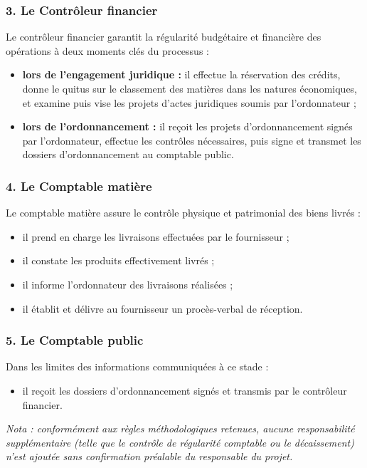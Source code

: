 \subsubsection{3. Le Contrôleur financier}
Le contrôleur financier garantit la régularité budgétaire et financière des opérations à deux moments clés du processus :
\begin{itemize}
  \item \textbf{lors de l'engagement juridique :} il effectue la réservation des crédits, donne le quitus sur le classement des matières dans les natures économiques, et examine puis vise les projets d'actes juridiques soumis par l'ordonnateur ;
  \item \textbf{lors de l'ordonnancement :} il reçoit les projets d'ordonnancement signés par l'ordonnateur, effectue les contrôles nécessaires, puis signe et transmet les dossiers d'ordonnancement au comptable public.
\end{itemize}

\subsubsection{4. Le Comptable matière}
Le comptable matière assure le contrôle physique et patrimonial des biens livrés :
\begin{itemize}
  \item il prend en charge les livraisons effectuées par le fournisseur ;
  \item il constate les produits effectivement livrés ;
  \item il informe l'ordonnateur des livraisons réalisées ;
  \item il établit et délivre au fournisseur un procès-verbal de réception.
\end{itemize}

\subsubsection{5. Le Comptable public}
Dans les limites des informations communiquées à ce stade :
\begin{itemize}
  \item il reçoit les dossiers d'ordonnancement signés et transmis par le contrôleur financier.
\end{itemize}
\emph{Nota : conformément aux règles méthodologiques retenues, aucune responsabilité supplémentaire (telle que le contrôle de régularité comptable ou le décaissement) n'est ajoutée sans confirmation préalable du responsable du projet.}

